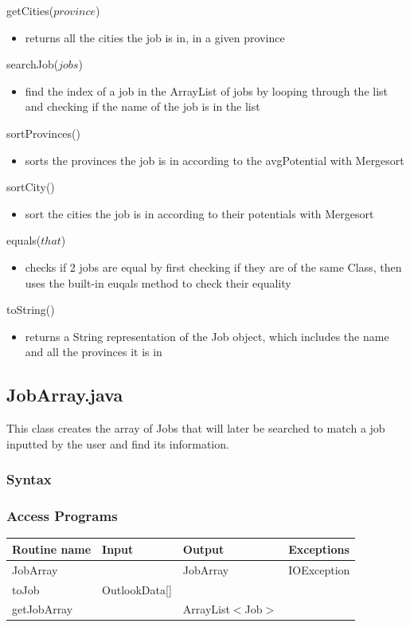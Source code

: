 \documentclass[12pt,fleqn]{article}
\begin{document}
\noindent getCities($province$)
\begin{itemize}
\item returns all the cities the job is in, in a given province
\end{itemize}
\noindent searchJob($jobs$)
\begin{itemize}
\item find the index of a job in the ArrayList of jobs by looping through the list and checking if the name of the
job is in the list
\end{itemize}
\noindent sortProvinces()
\begin{itemize}
\item sorts the provinces the job is in according to the avgPotential with Mergesort
\end{itemize}
\noindent sortCity()
\begin{itemize}
\item sort the cities the job is in according to their potentials with Mergesort
\end{itemize}
\noindent equals($that$)
\begin{itemize}
\item checks if 2 jobs are equal by first checking if they are of the same Class, then uses the built-in euqals
method to check their equality
\end{itemize}
\noindent toString()
\begin{itemize}
\item returns a String representation of the Job object, which includes the name and all the provinces it is in
\end{itemize}


\subsection*{JobArray.java}\label{jobarray}
This class creates the array of Jobs that will later be searched to match a job inputted by the user and find its information.
\subsubsection* {Syntax}

\subsubsection* {Access Programs}
\begin{tabular}{| l | l | l | l |}
\hline
\textbf{Routine name} & \textbf{Input} & \textbf{Output} & \textbf{Exceptions}\\
\hline
JobArray & ~ & JobArray & IOException\\
\hline
toJob & OutlookData[] & ~ & ~\\
\hline
getJobArray & ~ & ArrayList$<$Job$>$ & ~\\
\hline
\end{tabular}
\end{document}
